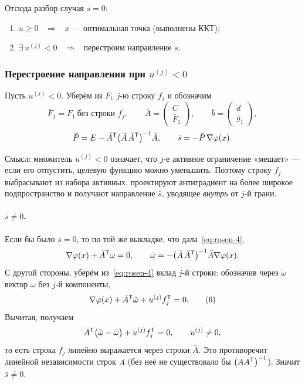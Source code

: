 Отсюда разбор случая $s = 0$:
\begin{enumerate}[label=\arabic*.,left=0pt]
  \item $u \ge 0$ \ $\Longrightarrow$ \ $x$ — оптимальная точка (выполнены ККТ);
  \item $\exists\, u^{(j)} < 0$ \ $\Longrightarrow$ \ перестроим направление $s$.
\end{enumerate}


\subsubsection*{Перестроение направления при $u^{(j)} < 0$}

Пусть $u^{(j)} < 0$. Уберём из $F_1$ $j$-ю строку $f_j$ и обозначим
\[
  \bar{F}_1 = F_1 \ \text{без строки } f_j ,
  \qquad
  \bar{A} = \begin{pmatrix} C \\ \hline \bar{F}_1 \end{pmatrix} ,
  \qquad
  \bar{b} = \begin{pmatrix} d \\ \hline \bar{g}_1 \end{pmatrix} ,
\]
\[
  \bar{P} = E - \bar{A}^{\mathsf{T}} \big(\bar{A}\,\bar{A}^{\mathsf{T}}\big)^{-1} \bar{A} ,
  \qquad
  \bar{s} = -\bar{P}\, \nabla\varphi(x) .
\]

\begin{idea}
Смысл: множитель $u^{(j)} < 0$ означает, что $j$-е активное ограничение
«мешает» — если его отпустить, целевую функцию можно уменьшить. Поэтому строку
$f_j$ выбрасывают из набора активных, проектируют антиградиент на более широкое
подпространство и получают направление $\bar{s}$, уводящее \emph{внутрь} от
$j$-й грани.
\end{idea}

\paragraph{$\bar{s} \ne 0$.}
Если бы было $\bar{s} = 0$, то по той же выкладке, что
дала~\eqref{eq:rosen-4},
\[
  \nabla\varphi(x) + \bar{A}^{\mathsf{T}} \bar\omega = 0 ,
  \qquad
  \bar\omega = -\big(\bar{A}\,\bar{A}^{\mathsf{T}}\big)^{-1} \bar{A} \nabla\varphi(x) .
\]
С другой стороны, уберём из~\eqref{eq:rosen-4} вклад $j$-й строки: обозначив
через $\tilde\omega$ вектор $\omega$ без $j$-й компоненты,
\[
  \nabla\varphi(x) + \bar{A}^{\mathsf{T}} \tilde\omega + u^{(j)} f_j^{\mathsf{T}} = 0 .
  \tag{6}\label{eq:rosen-6}
\]
Вычитая, получаем
\[
  \bar{A}^{\mathsf{T}}\big(\tilde\omega - \bar\omega\big) + u^{(j)} f_j^{\mathsf{T}} = 0 ,
  \qquad u^{(j)} \ne 0 ,
\]
то есть строка $f_j$ линейно выражается через строки $\bar{A}$. Это
противоречит линейной независимости строк $A$ (без неё не существовало бы
$\big(A A^{\mathsf{T}}\big)^{-1}$). Значит $\bar{s} \ne 0$.

